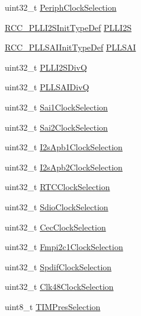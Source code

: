 \begin{DoxyCompactItemize}
\item 
uint32\+\_\+t \hyperlink{struct_r_c_c___periph_c_l_k_init_type_def_a1fe6e3d75864d85b911eef15dfc35925}{Periph\+Clock\+Selection}
\item 
\hyperlink{struct_r_c_c___p_l_l_i2_s_init_type_def}{R\+C\+C\+\_\+\+P\+L\+L\+I2\+S\+Init\+Type\+Def} \hyperlink{struct_r_c_c___periph_c_l_k_init_type_def_acc2f1ab5bca1f524c6dc9f7b8dce747d}{P\+L\+L\+I2S}
\item 
\hyperlink{struct_r_c_c___p_l_l_s_a_i_init_type_def}{R\+C\+C\+\_\+\+P\+L\+L\+S\+A\+I\+Init\+Type\+Def} \hyperlink{struct_r_c_c___periph_c_l_k_init_type_def_a5bfc6178ab362422276fcc36be9ba7a9}{P\+L\+L\+S\+AI}
\item 
uint32\+\_\+t \hyperlink{struct_r_c_c___periph_c_l_k_init_type_def_a158247326a43b3ce7eb1d2907ced6234}{P\+L\+L\+I2\+S\+DivQ}
\item 
uint32\+\_\+t \hyperlink{struct_r_c_c___periph_c_l_k_init_type_def_a08da65a7dcf29461768f246f37531cf5}{P\+L\+L\+S\+A\+I\+DivQ}
\item 
uint32\+\_\+t \hyperlink{struct_r_c_c___periph_c_l_k_init_type_def_adc2a83ae9e108a3f7afb01c58f3a4f1a}{Sai1\+Clock\+Selection}
\item 
uint32\+\_\+t \hyperlink{struct_r_c_c___periph_c_l_k_init_type_def_a16f7cf65806df3589a4bab521315d8df}{Sai2\+Clock\+Selection}
\item 
uint32\+\_\+t \hyperlink{struct_r_c_c___periph_c_l_k_init_type_def_aed6e10bc77b5bde090bb3fdba9c9fb54}{I2s\+Apb1\+Clock\+Selection}
\item 
uint32\+\_\+t \hyperlink{struct_r_c_c___periph_c_l_k_init_type_def_a8e83b13202658abe7a60e0e55b767455}{I2s\+Apb2\+Clock\+Selection}
\item 
uint32\+\_\+t \hyperlink{struct_r_c_c___periph_c_l_k_init_type_def_ad2c422d62b056a61d7bbb599c89dbc1e}{R\+T\+C\+Clock\+Selection}
\item 
uint32\+\_\+t \hyperlink{struct_r_c_c___periph_c_l_k_init_type_def_ac5260f32f4287234dec14829033f1652}{Sdio\+Clock\+Selection}
\item 
uint32\+\_\+t \hyperlink{struct_r_c_c___periph_c_l_k_init_type_def_a344e2489c3faf2150fafbafc86b86812}{Cec\+Clock\+Selection}
\item 
uint32\+\_\+t \hyperlink{struct_r_c_c___periph_c_l_k_init_type_def_ad5cccf5bf29ec78119677af6a0507848}{Fmpi2c1\+Clock\+Selection}
\item 
uint32\+\_\+t \hyperlink{struct_r_c_c___periph_c_l_k_init_type_def_a0d510e8063617a0d6cd5cdb04e247667}{Spdif\+Clock\+Selection}
\item 
uint32\+\_\+t \hyperlink{struct_r_c_c___periph_c_l_k_init_type_def_abcb1d9026f5ad149b6e0d1194f82b852}{Clk48\+Clock\+Selection}
\item 
uint8\+\_\+t \hyperlink{struct_r_c_c___periph_c_l_k_init_type_def_a6bfa5cc9c6a8a034b552f02682dec8d4}{T\+I\+M\+Pres\+Selection}
\end{DoxyCompactItemize}


